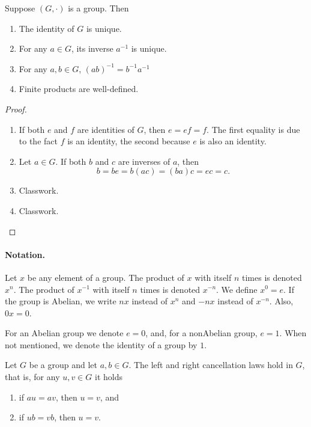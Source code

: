 \documentclass[11pt,a4paper]{article}
\begin{document}
\begin{prop}
    Suppose \((G, \cdot)\) is a group.
    Then 
    \begin{enumerate}[label=(\roman*)]
        \item The identity of \(G\) is unique.
        \item For any \(a\in G\), its inverse \(a^{-1}\) is unique.
        \item For any \(a,b\in G\), \quad \((ab)^{-1} = b^{-1}a^{-1}\)
        \item Finite products are well-defined.
    \end{enumerate}
\end{prop}

\begin{proof}
\begin{enumerate}[label=(\roman*)]
    \item If both \(e\) and \(f\) are identities of \(G\), then \(e= ef = f\). The first equality is due to the fact    \(f\) is an identity, the second because  \(e\) is also an identity.
    \item Let \(a\in G\). If both \(b\) and \(c\) are inverses of \(a\), then
        \[b = b e = b (ac) = (ba) c = e c = c. \]
    \item Classwork.
    \item Classwork.
\end{enumerate}
\end{proof}

\paragraph{Notation.} Let \(x\) be any element of a group. The product of \(x\) with itself \(n\) times is denoted \(x^{n}\).
The product of \(x^{-1}\) with itself \(n\) times is denoted \(x^{-n}\).
We define \(x^{0} = e\).
If the group is Abelian, we write \(nx\) instead of \(x^n\) and \(-nx\) instead of \(x^{ {-n}}\).
Also, \(0x = 0\).


\begin{rem}
    For an Abelian group we denote \(e= 0\), and, for a nonAbelian group, \(e=1.\)
    When not mentioned, we denote the identity of a group by \(1\).
\end{rem}


\begin{prop}
    Let $G$ be a group and let $a, b \in G$. The left and right cancellation laws hold in $G$, that is, for any \(u,v\in G\) it holds
    \begin{enumerate}[label=(\roman*)]
        \item if $a u=a v$, then $u=v$, and
        \item if $u b=v b$, then $u=v$.
    \end{enumerate}
\end{prop}
\end{document}
